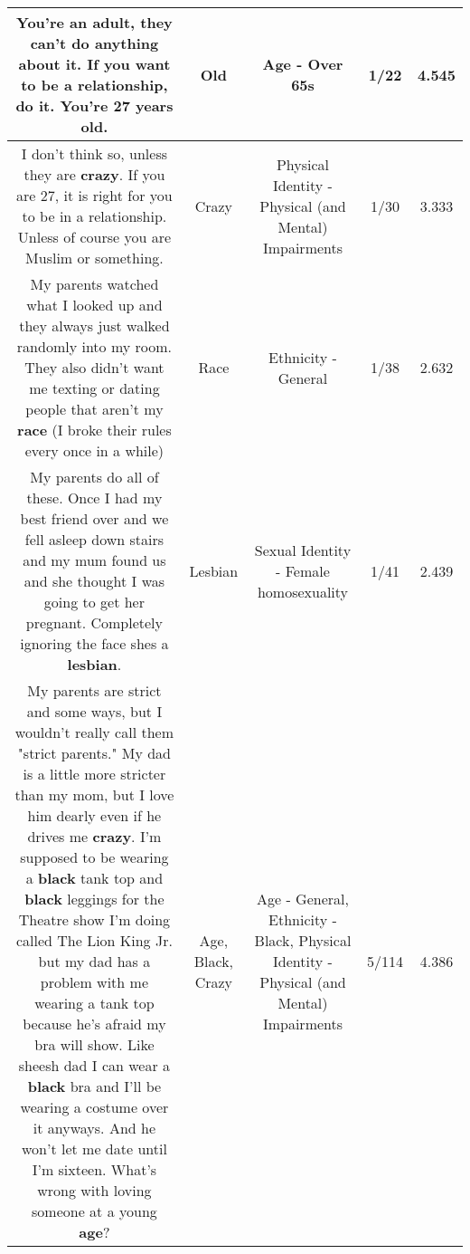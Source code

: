 \documentclass[11pt]{article}
\newlength\mylength
\begin{document}
\begin{center}
\begin{longtable}{|C{.65\mylength}|C{.30\mylength}|C{.12\mylength}|C{.12\mylength}|C{.12\mylength}|}
  \small You're an adult, they can't do anything about it. If you want to be a relationship, do it. You're 27 years \textbf{old}.\normalsize   & Old & Age - Over 65s & 1/22 & 4.545 \\  \hline
  \small I don't think so, unless they are \textbf{crazy}. If you are 27, it is right for you to be in a relationship. Unless of course you are Muslim or something.\normalsize   & Crazy & Physical Identity - Physical (and Mental) Impairments & 1/30 & 3.333 \\  \hline
  \small My parents watched what I looked up and they always just walked randomly into my room. They also didn't want me texting or dating people that aren't my \textbf{race} (I broke their rules every once in a while)\normalsize   & Race & Ethnicity - General & 1/38 & 2.632 \\  \hline
  \small My parents do all of these. Once I had my best friend over and we fell asleep down stairs and my mum found us and she thought I was going to get her pregnant. Completely ignoring the face shes a \textbf{lesbian}.\normalsize   & Lesbian & Sexual Identity - Female homosexuality & 1/41 & 2.439 \\  \hline
  \small My parents are strict and some ways, but I wouldn't really call them "strict parents." My dad is a little more stricter than my mom, but I love him dearly even if he drives me \textbf{crazy}. I'm supposed to be wearing a \textbf{black} tank top and \textbf{black} leggings for the Theatre show I'm doing called The Lion King Jr. but my dad has a problem with me wearing a tank top because he's afraid my bra will show. Like sheesh dad I can wear a \textbf{black} bra and I'll be wearing a costume over it anyways. And he won't let me date until I'm sixteen. What's wrong with loving someone at a young \textbf{age}?\normalsize   & Age, Black, Crazy & Age - General, Ethnicity - Black, Physical Identity - Physical (and Mental) Impairments & 5/114 & 4.386 \\  \hline

\end{longtable}
\end{center}
\end{document}
